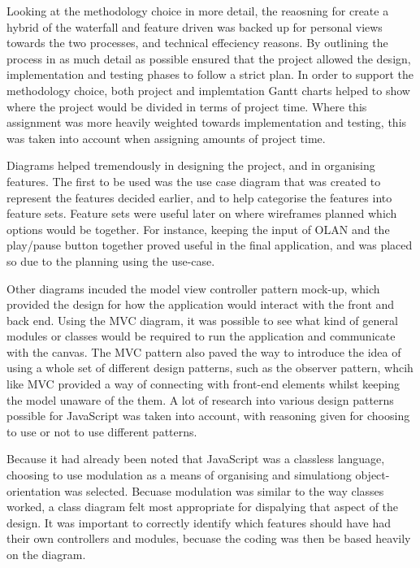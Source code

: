 Looking at the methodology choice in more detail, the reaosning for create a hybrid of the waterfall and feature driven was backed up for personal views towards the two processes, and technical effeciency reasons. By outlining the process in as much detail as possible ensured that the project allowed the design, implementation and testing phases to follow a strict plan. In order to support the methodology choice, both project and implemtation Gantt charts helped to show where the project would be divided in terms of project time. Where this assignment was more heavily weighted towards implementation and testing, this was taken into account when assigning amounts of project time.

Diagrams helped tremendously in designing the project, and in organising features. The first to be used was the use case diagram that was created to represent the features decided earlier, and to help categorise the features into feature sets. Feature sets were useful later on where wireframes planned which options would be together. For instance, keeping the input of OLAN and the play/pause button together proved useful in the final application, and was placed so due to the planning using the use-case.

Other diagrams incuded the model view controller pattern mock-up, which provided the design for how the application would interact with the front and back end. Using the MVC diagram, it was possible to see what kind of general modules or classes would be required to run the application and communicate with the canvas. The MVC pattern also paved the way to introduce the idea of using a whole set of different design patterns, such as the observer pattern, whcih like MVC provided a way of connecting with front-end elements whilst keeping the model unaware of the them. A lot of research into various design patterns possible for JavaScript was taken into account, with reasoning given for choosing to use or not to use different patterns.

Because it had already been noted that JavaScript was a classless language, choosing to use modulation as a means of organising and simulationg object-orientation was selected. Becuase modulation was similar to the way classes worked, a class diagram felt most appropriate for dispalying that aspect of the design. It was important to correctly identify which features should have had their own controllers and modules, becuase the coding was then be based heavily on the diagram.

